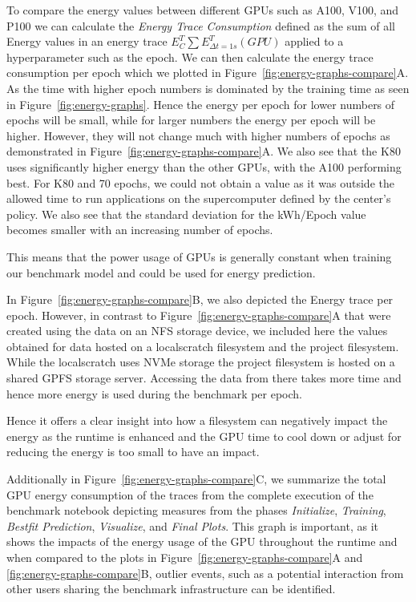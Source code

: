
To compare the energy values between different GPUs such as A100, V100, and P100 we can calculate the {\em Energy Trace Consumption} defined as the sum of all Energy values in an energy trace $E^T_C \sum E^T_{\Delta t=1s}(GPU)$ applied to a hyperparameter such as the epoch.  We can then calculate the energy trace consumption per epoch which we plotted in Figure~\ref{fig:energy-graphs-compare}A.  As the time with higher epoch numbers is dominated by the training time as seen in Figure~\ref{fig:energy-graphs}.  Hence the energy per epoch for lower numbers of epochs will be small, while for larger numbers the energy per epoch will be higher. However, they will not change much with higher numbers of epochs as demonstrated in Figure~\ref{fig:energy-graphs-compare}A.  We also see that the K80 uses significantly higher energy than the other GPUs, with the A100 performing best. For K80 and 70 epochs, we could not obtain a value as it was outside the allowed time to run applications on the supercomputer defined by the center's policy.  We also see that the standard deviation for the kWh/Epoch value becomes smaller with an increasing number of epochs.

This means that the power usage of GPUs is generally constant when training our benchmark model and could be used for energy prediction.



In Figure~\ref{fig:energy-graphs-compare}B, we also depicted the Energy trace per epoch. However, in contrast to Figure~\ref{fig:energy-graphs-compare}A that were created using the data on an NFS storage device, we included here the values obtained for data hosted on a localscratch filesystem and the project filesystem. While the localscratch uses NVMe storage the project filesystem is hosted on a shared GPFS storage server. Accessing the data from there takes more time and hence more energy is used during the benchmark per epoch.

Hence it offers a clear insight into how a filesystem can negatively impact the energy as the runtime is enhanced and the GPU time to cool down or adjust for reducing the energy is too small to have an impact.


Additionally in Figure~\ref{fig:energy-graphs-compare}C, we summarize the total GPU energy consumption of the traces from the complete execution of the benchmark notebook depicting measures from the phases {\em Initialize}, {\em Training}, {\em Bestfit Prediction}, {\em Visualize}, and {\em Final Plots}.  This graph is important, as it shows the impacts of the energy usage of the GPU throughout the runtime and when compared to the plots in Figure~\ref{fig:energy-graphs-compare}A and \ref{fig:energy-graphs-compare}B, outlier events, such as a potential interaction from other users sharing the benchmark infrastructure can be identified.


